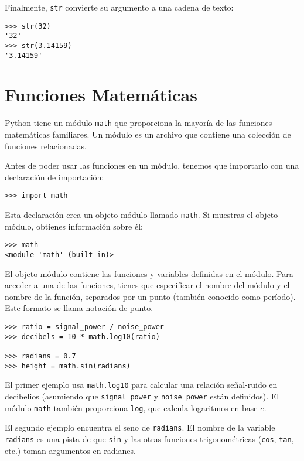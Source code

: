 Finalmente, \texttt{str} convierte su argumento a una cadena de texto:

\begin{lstlisting}
>>> str(32)
'32'
>>> str(3.14159)
'3.14159'
\end{lstlisting}

\section{Funciones Matemáticas}

Python tiene un módulo \texttt{math} que proporciona la mayoría de las funciones matemáticas familiares. Un módulo es un archivo que contiene una colección de funciones relacionadas.

Antes de poder usar las funciones en un módulo, tenemos que importarlo con una declaración de importación:

\begin{lstlisting}
>>> import math
\end{lstlisting}

Esta declaración crea un objeto módulo llamado \texttt{math}. Si muestras el objeto módulo, obtienes información sobre él:

\begin{lstlisting}
>>> math
<module 'math' (built-in)>
\end{lstlisting}

El objeto módulo contiene las funciones y variables definidas en el módulo. Para acceder a una de las funciones, tienes que especificar el nombre del módulo y el nombre de la función, separados por un punto (también conocido como período). Este formato se llama notación de punto.

\begin{lstlisting}
>>> ratio = signal_power / noise_power
>>> decibels = 10 * math.log10(ratio)

>>> radians = 0.7
>>> height = math.sin(radians)
\end{lstlisting}

El primer ejemplo usa \texttt{math.log10} para calcular una relación señal-ruido en decibelios (asumiendo que \texttt{signal\_power} y \texttt{noise\_power} están definidos). El módulo \texttt{math} también proporciona \texttt{log}, que calcula logaritmos en base $e$.

El segundo ejemplo encuentra el seno de \texttt{radians}. El nombre de la variable \texttt{radians} es una pista de que \texttt{sin} y las otras funciones trigonométricas (\texttt{cos}, \texttt{tan}, etc.) toman argumentos en radianes.

